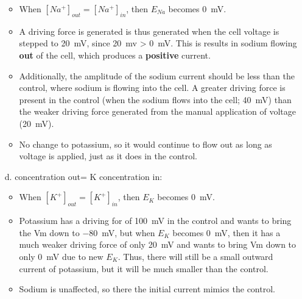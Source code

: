 \documentclass[plain,worksheet]{inVerba-notes}
\begin{document}
\begin{enumerate}[resume]
    \begin{itemize}
        \item When \([Na^+]_{out}=[Na^+]_{in}\), then \(E_{Na}\) becomes \SI{0}{mV}.
        \item A driving force is generated is thus generated when the cell voltage is stepped to \SI{+20}{mV}, since \SI{20}{mv} > \SI{0}{mV}. This is results in sodium flowing \textbf{out} of the cell, which produces a \textbf{positive} current.
        \item Additionally, the amplitude of the sodium current should be less than the control, where sodium is flowing into the cell. A greater driving force is present in the control (when the sodium flows into the cell; \SI{40}{mV}) than the weaker driving force generated from the manual application of voltage (\SI{20}{mV}).
        \item No change to potassium, so it would continue to flow out as long as voltage is applied, just as it does in the control.
    \end{itemize}

    \item[d.]  concentration out= K concentration in:

    \bigskip
    \bigskip
    \begin{center}
        
    \end{center}
    
    \begin{itemize}
        \item When \([K^+]_{out}=[K^+]_{in}\), then \(E_{K}\) becomes \SI{0}{mV}. 
        \item Potassium has a driving for of \SI{100}{mV} in the control and wants to bring the Vm down to \SI{-80}{mV}, but when \(E_{K}\) becomes \SI{0}{mV}, then it has a much weaker driving force of only \SI{20}{mV} and wants to bring Vm down to only \SI{0}{mV} due to new \(E_K\). Thus, there will still be a small outward current of potassium, but it will be much smaller than the control.
        \item Sodium is unaffected, so there the initial current mimics the control.
    \end{itemize}
\end{enumerate}
\end{document}
